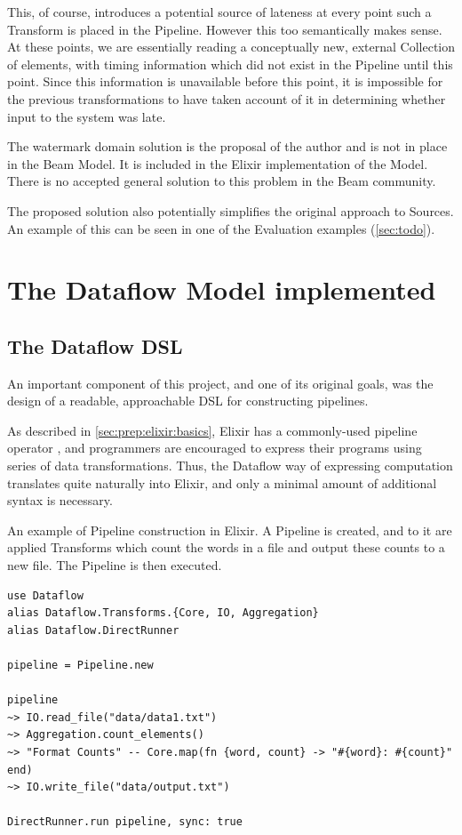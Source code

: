 This, of course, introduces a potential source of lateness at every point such a Transform is placed in the Pipeline.
However this too semantically makes sense.
At these points, we are essentially reading a conceptually new, external Collection of elements, with timing information which did not exist in the Pipeline until this point.
Since this information is unavailable before this point, it is impossible for the previous transformations to have taken account of it in determining whether input to the system was late.

The watermark domain solution is the proposal of the author and is not in place in the Beam Model.
It is included in the Elixir implementation of the Model.
There is no accepted general solution to this problem in the Beam community.

The proposed solution also potentially simplifies the original approach to Sources.
An example of this can be seen in one of the Evaluation examples (\cref{sec:todo}).


\section{The Dataflow Model implemented}\label{sec:impl:approach}

\subsection{The Dataflow DSL}\label{sec:impl:approach:dsl}

An important component of this project, and one of its original goals, was the design of a readable, approachable DSL for constructing pipelines.

As described in \cref{sec:prep:elixir:basics}, Elixir has a commonly-used pipeline operator \exs{|>}, and programmers are encouraged to express their programs using series of data transformations.
Thus, the Dataflow way of expressing computation translates quite naturally into Elixir, and only a minimal amount of additional syntax is necessary.

\begin{listing}[h]
	\caption[An example of Pipeline construction in Elixir.]{An example of Pipeline construction in Elixir. A Pipeline is created, and to it are applied Transforms which count the words in a file and output these counts to a new file. The Pipeline is then executed.}
	\label{lst:impl:elixir-construct-pipeline}
	\begin{verbatim}
use Dataflow
alias Dataflow.Transforms.{Core, IO, Aggregation}
alias Dataflow.DirectRunner

pipeline = Pipeline.new

pipeline
~> IO.read_file("data/data1.txt")
~> Aggregation.count_elements()
~> "Format Counts" -- Core.map(fn {word, count} -> "#{word}: #{count}" end)
~> IO.write_file("data/output.txt")

DirectRunner.run pipeline, sync: true

	\end{verbatim}
\end{listing}

